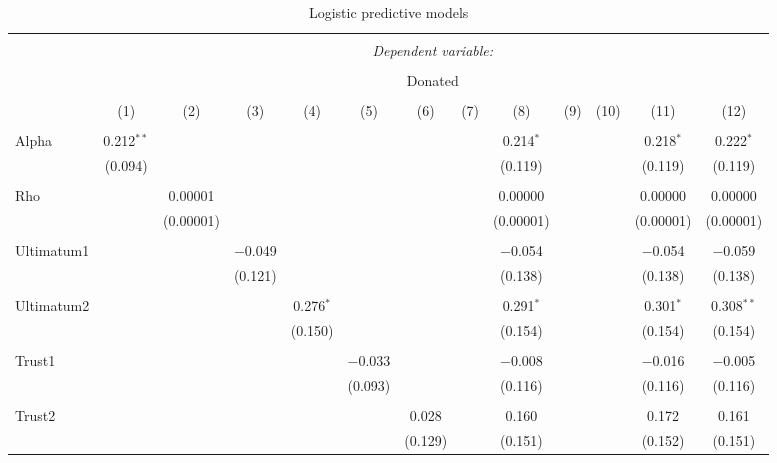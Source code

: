 \begin{table}[H] \centering 
  \caption{Logistic predictive models} 
  \label{} 
  \begin{adjustbox}{width=\textwidth}
\begin{tabular}{@{\extracolsep{5pt}}lcccccccccccc} 
\\[-1.8ex]\hline 
\hline \\[-1.8ex] 
 & \multicolumn{12}{c}{\textit{Dependent variable:}} \\ 
\cline{2-13} 
\\[-1.8ex] & \multicolumn{12}{c}{Donated} \\ 
\\[-1.8ex] & (1) & (2) & (3) & (4) & (5) & (6) & (7) & (8) & (9) & (10) & (11) & (12)\\ 
\hline \\[-1.8ex] 
 Alpha & 0.212$^{**}$ &  &  &  &  &  &  & 0.214$^{*}$ &  &  & 0.218$^{*}$ & 0.222$^{*}$ \\ 
  & (0.094) &  &  &  &  &  &  & (0.119) &  &  & (0.119) & (0.119) \\ 
  & & & & & & & & & & & & \\ 
 Rho &  & 0.00001 &  &  &  &  &  & 0.00000 &  &  & 0.00000 & 0.00000 \\ 
  &  & (0.00001) &  &  &  &  &  & (0.00001) &  &  & (0.00001) & (0.00001) \\ 
  & & & & & & & & & & & & \\ 
 Ultimatum1 &  &  & $-$0.049 &  &  &  &  & $-$0.054 &  &  & $-$0.054 & $-$0.059 \\ 
  &  &  & (0.121) &  &  &  &  & (0.138) &  &  & (0.138) & (0.138) \\ 
  & & & & & & & & & & & & \\ 
 Ultimatum2 &  &  &  & 0.276$^{*}$ &  &  &  & 0.291$^{*}$ &  &  & 0.301$^{*}$ & 0.308$^{**}$ \\ 
  &  &  &  & (0.150) &  &  &  & (0.154) &  &  & (0.154) & (0.154) \\ 
  & & & & & & & & & & & & \\ 
 Trust1 &  &  &  &  & $-$0.033 &  &  & $-$0.008 &  &  & $-$0.016 & $-$0.005 \\ 
  &  &  &  &  & (0.093) &  &  & (0.116) &  &  & (0.116) & (0.116) \\ 
  & & & & & & & & & & & & \\ 
 Trust2 &  &  &  &  &  & 0.028 &  & 0.160 &  &  & 0.172 & 0.161 \\ 
  &  &  &  &  &  & (0.129) &  & (0.151) &  &  & (0.152) & (0.151) \\ 

\end{tabular}
\end{adjustbox}
\end{table}
